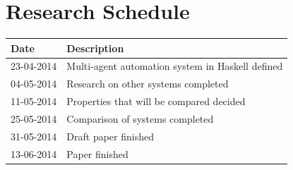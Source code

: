 \documentclass{sig-alternate-br}
\begin{document}
\section{Research Schedule}
\begin{table}[h]
\begin{tabular}{ll}
Date & Description \\ \hline
23-04-2014 & Multi-agent automation system in Haskell defined \\
04-05-2014 & Research on other systems completed \\
11-05-2014 & Properties that will be compared decided \\
25-05-2014 & Comparison of systems completed \\
31-05-2014 & Draft paper finished \\
13-06-2014 & Paper finished \\
\hline\end{tabular}
\end{table}


%
%
\vspace{50 mm}
\newpage
\end{document}

